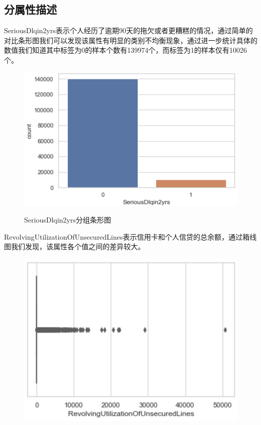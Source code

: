 \documentclass{zjureport}
\begin{document}
    
\subsection{分属性描述}
\begin{clause}
    \item SeriousDlqin2yrs表示个人经历了逾期90天的拖欠或者更糟糕的情况，通过简单的对比条形图我们可以发现该属性有明显的类别不均衡现象，通过进一步统计具体的数值我们知道其中标签为0的样本个数有139974个，而标签为1的样本仅有10026个。
    \begin{figure}[H]
    \centering
    \includegraphics[scale=0.7]{figures/image3.png}\\
    \caption{SeriousDlqin2yrs分组条形图}
    \end{figure}
    \item RevolvingUtilizationOfUnsecuredLines表示信用卡和个人信贷的总余额，通过箱线图我们发现，该属性各个值之间的差异较大。
    \begin{figure}[H]
    \centering
    \includegraphics[scale=0.7]{figures/image4.png}\\

\end{figure}
\end{clause}
\end{document}
